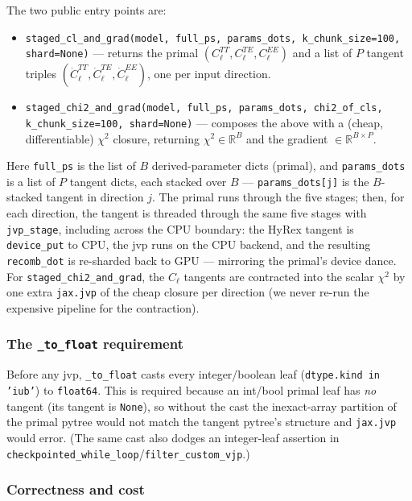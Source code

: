 \documentclass[11pt]{article}
\newcommand{\code}[1]{\texttt{\small #1}}
\newcommand{\Cl}{C_\ell}
\newcommand{\chisq}{\chi^2}
\newcommand{\R}{\mathbb{R}}
\begin{document}
The two public entry points are:
\begin{itemize}[leftmargin=1.5em]
\item \code{staged\_cl\_and\_grad(model, full\_ps, params\_dots,
k\_chunk\_size=100, shard=None)} --- returns the primal
$(\Cl^{TT},\Cl^{TE},\Cl^{EE})$ and a list of $P$ tangent triples
$(\dot\Cl^{TT},\dot\Cl^{TE},\dot\Cl^{EE})$, one per input direction.
\item \code{staged\_chi2\_and\_grad(model, full\_ps, params\_dots,
chi2\_of\_cls, k\_chunk\_size=100, shard=None)} --- composes the above
with a (cheap, differentiable) $\chisq$ closure, returning
$\chisq\in\R^{B}$ and the gradient $\in\R^{B\times P}$.
\end{itemize}
Here \code{full\_ps} is the list of $B$ derived-parameter dicts (primal),
and \code{params\_dots} is a list of $P$ tangent dicts, each stacked over
$B$ --- \code{params\_dots[j]} is the $B$-stacked tangent in direction
$j$. The primal runs through the five stages; then, for each direction,
the tangent is threaded through the same five stages with
\code{jvp\_stage}, including across the CPU boundary: the HyRex tangent is
\code{device\_put} to CPU, the jvp runs on the CPU backend, and the
resulting \code{recomb\_dot} is re-sharded back to GPU --- mirroring the
primal's device dance. For \code{staged\_chi2\_and\_grad}, the $\Cl$
tangents are contracted into the scalar $\chisq$ by one extra
\code{jax.jvp} of the cheap closure per direction (we never re-run the
expensive pipeline for the contraction).

\subsubsection{The \texttt{\_to\_float} requirement}

Before any jvp, \code{\_to\_float} casts every integer/boolean leaf
(\code{dtype.kind in 'iub'}) to \code{float64}. This is required because
an int/bool primal leaf has \emph{no} tangent (its tangent is
\code{None}), so without the cast the inexact-array partition of the
primal pytree would not match the tangent pytree's structure and
\code{jax.jvp} would error. (The same cast also dodges an integer-leaf
assertion in \code{checkpointed\_while\_loop}/\code{filter\_custom\_vjp}.)

\subsubsection{Correctness and cost}
\label{sec:gradcost}
\end{document}
